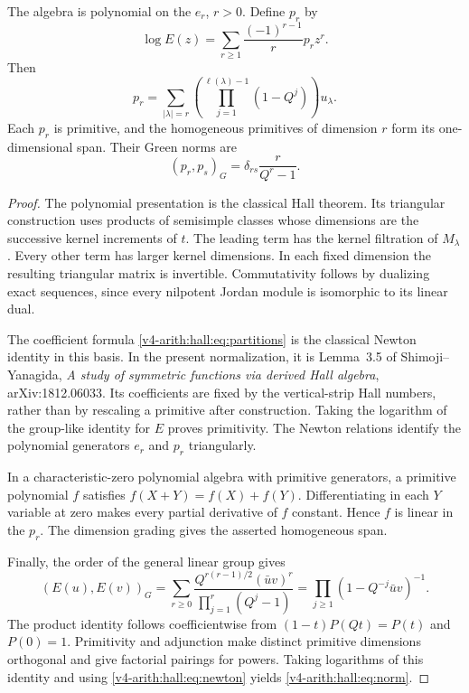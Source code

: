 \begin{theorem}
\label{v4-arith:hall:thm:primitives}
The algebra is polynomial on the $e_r$, $r>0$.
Define $p_r$ by
\begin{equation}\label{v4-arith:hall:eq:newton}
 \log E(z)=\sum_{r\geq1}\frac{(-1)^{r-1}}r p_rz^r.
\end{equation}
Then
\begin{equation}\label{v4-arith:hall:eq:partitions}
 p_r=\sum_{|\lambda|=r}
       \left(\prod_{j=1}^{\ell(\lambda)-1}(1-Q^j)\right)u_\lambda.
\end{equation}
Each $p_r$ is primitive, and the homogeneous primitives of dimension
$r$ form its one-dimensional span. Their Green norms are
\begin{equation}\label{v4-arith:hall:eq:norm}
 (p_r,p_s)_G=\delta_{rs}\frac{r}{Q^r-1}.
\end{equation}
\end{theorem}
\begin{proof}
The polynomial presentation is the classical Hall theorem.
Its triangular construction uses products of semisimple classes
whose dimensions are the successive kernel increments of $t$.
The leading term has the kernel filtration of $M_\lambda$.
Every other term has larger kernel dimensions. In each fixed
dimension the resulting triangular matrix is invertible.
Commutativity follows by dualizing exact sequences, since every
nilpotent Jordan module is isomorphic to its linear dual.

The coefficient formula \eqref{v4-arith:hall:eq:partitions} is the
classical Newton identity in this basis. In the present normalization,
it is Lemma~3.5 of Shimoji--Yanagida,
\emph{A study of symmetric functions via derived Hall algebra},
arXiv:1812.06033. Its coefficients are fixed by the vertical-strip
Hall numbers, rather than by rescaling a primitive after construction.
Taking the logarithm of the group-like identity for $E$ proves
primitivity. The Newton relations identify the polynomial generators
$e_r$ and $p_r$ triangularly.

In a characteristic-zero polynomial algebra with primitive
generators, a primitive polynomial $f$ satisfies $f(X+Y)=f(X)+f(Y)$.
Differentiating in each $Y$ variable at zero makes every partial
derivative of $f$ constant. Hence $f$ is linear in the $p_r$.
The dimension grading gives the asserted homogeneous span.

Finally, the order of the general linear group gives
\[
 (E(u),E(v))_G
 =\sum_{r\geq0}
   \frac{Q^{r(r-1)/2}(\bar uv)^r}{\prod_{j=1}^r(Q^j-1)}
 =\prod_{j\geq1}(1-Q^{-j}\bar uv)^{-1}.
\]
The product identity follows coefficientwise from
$(1-t)P(Qt)=P(t)$ and $P(0)=1$.
Primitivity and adjunction make distinct primitive dimensions
orthogonal and give factorial pairings for powers. Taking logarithms
of this identity and using \eqref{v4-arith:hall:eq:newton} yields
\eqref{v4-arith:hall:eq:norm}.
\end{proof}

